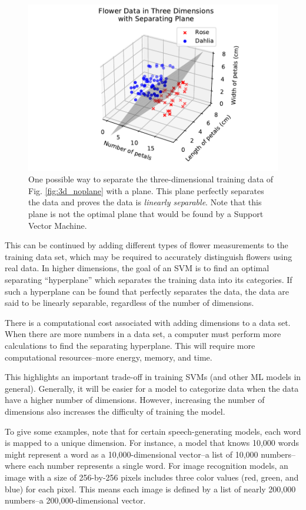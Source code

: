 \documentclass[%
 reprint,
nofootinbib,
 amsmath,amssymb,
 aps,
]{revtex4-2}
\begin{document}
\begin{figure}
    \includegraphics[width=\linewidth]{Figures/3d_plane.pdf}
    \caption{\label{fig:3d_plane}One possible way to separate the three-dimensional training data of Fig. \ref{fig:3d_noplane} with a plane. This plane perfectly separates the data and proves the data is \textit{linearly separable}. Note that this plane is not the optimal plane that would be found by a Support Vector Machine.}
\end{figure}

This can be continued by adding different types of flower measurements to the training data set, which may be required to accurately distinguish flowers using real data. In higher dimensions, the goal of an SVM is to find an optimal separating ``hyperplane'' which separates the training data into its categories. If such a hyperplane can be found that perfectly separates the data, the data are said to be linearly separable, regardless of the number of dimensions.

There is a computational cost associated with adding dimensions to a data set. When there are more numbers in a data set, a computer must perform more calculations to find the separating hyperplane. This will require more computational resources--more energy, memory, and time.

This highlights an important trade-off in training SVMs (and other ML models in general). Generally, it will be easier for a model to categorize data when the data have a higher number of dimensions. However, increasing the number of dimensions also increases the difficulty of training the model.

To give some examples, note that for certain speech-generating models, each word is mapped to a unique dimension. For instance, a model that knows 10,000 words might represent a word as a 10,000-dimensional vector--a list of 10,000 numbers--where each number represents a single word. For image recognition models, an image with a size of 256-by-256 pixels includes three color values (red, green, and blue) for each pixel. This means each image is defined by a list of nearly 200,000 numbers--a 200,000-dimensional vector. 
\end{document}
